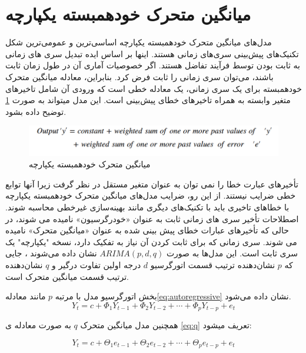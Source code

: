 \section[میانگین خودهمبسته یکپارچه]{میانگین متحرک خودهمبسته یکپارچه\protect{}}
مدل‌های میانگین متحرک خودهمبسته یکپارچه اساسی‌ترین و عمومی‌ترین شکل تکنیک‌های پیش‌بینی سری‌های زمانی هستند. اینها بر اساس ایده تبدیل سری های زمانی به ثابت بودن توسط فرآیند تفاضل هستند. اگر خصوصیات آماری آن در طول زمان ثابت باشند، می‌توان سری زمانی را ثابت فرض کرد. بنابراین، معادله میانگین متحرک خودهمبسته  برای یک سری زمانی، یک معادله خطی است که ورودی آن شامل تاخیرهای متغیر وابسته به همراه تاخیرهای خطای پیش‌بینی است.
این مدل میتواند به صورت \ref{fig:ARIMA} توضیح داده بشود.

\begin{figure}[ht!]
    \begin{center}
        \includegraphics[width=12cm]{images/ARIMA.png}
    \end{center}
    \caption[میانگین متحرک خودهمبسته یکپارچه]{میانگین متحرک خودهمبسته یکپارچه}
    \label{fig:ARIMA}
    \end{figure}

\noindent
تأخیرهای عبارت خطا را نمی توان به عنوان متغیر مستقل در نظر گرفت زیرا آنها توابع خطی ضرایب نیستند. از این رو، ضرایب مدل‌های میانگین متحرک خودهمبسته یکپارچه 
با خطاهای تاخیری باید با تکنیک‌های دیگری مانند بهینه‌سازی غیرخطی محاسبه شوند. اصطلاحات تأخیر سری های زمانی ثابت به عنوان «خودرگرسیون» نامیده می شوند، 
در حالی که تأخیرهای عبارات خطای پیش بینی شده به عنوان «میانگین متحرک» نامیده می شوند. سری زمانی که برای ثابت کردن آن نیاز به تفکیک دارد،
    نسخه "یکپارچه" یک سری ثابت است.
    این مدل‌ها به صورت $ARIMA (p,d,q)$ نشان داده می‌شوند
، جایی که $p$ نشان‌دهنده ترتیب قسمت اتورگرسیو $d$ درجه اولین تفاوت درگیر و $q$ نشان‌دهنده ترتیب قسمت میانگین متحرک است.

بخش اتورگرسیو مدل با مرتبه $p$ مانند معادله\ref*{eq:autoregressive} نشان داده می‌شود.
\begin{equation}\label{eq:autoregressive}
    Y_t = c + \Phi_1 Y_{t-1} + \Phi_2 Y_{t-2} + \cdots + \Phi_p Y_{t-p} + e_t
\end{equation}

همچنین مدل میانگین متحرک $q$ به صورت معادله ی \ref{eq:q} تعریف میشود:

\begin{equation}\label{eq:q}
    Y_t = c + \Theta_1 e_{t-1} + \Theta_2 e_{t-2} + \cdots + \Theta_p e_{t-p} + e_t
\end{equation}

